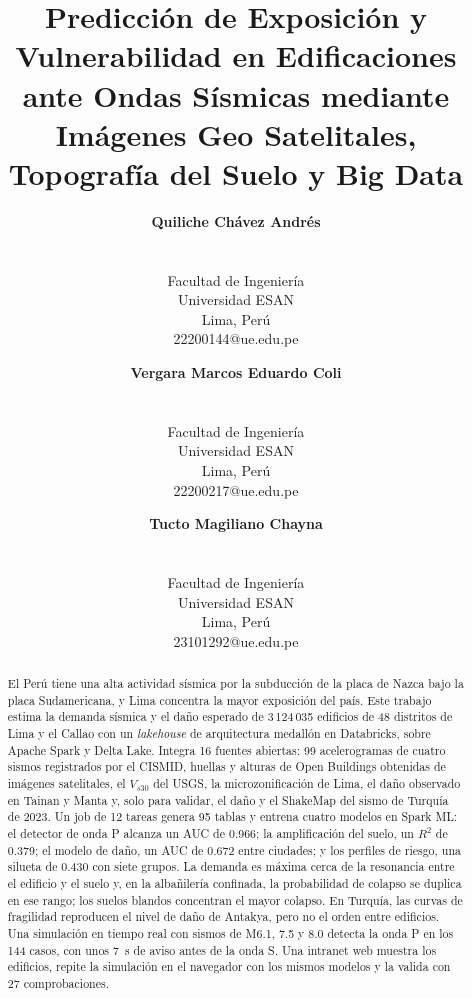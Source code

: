 \documentclass[conference]{IEEEtran}%
\makeatletter
\providecommand{\IEEEauthorblockN}[1]{\begin{tabular}{@{}c@{}}\textbf{#1}\end{tabular}\\}
\providecommand{\IEEEauthorblockA}[1]{\begin{tabular}{@{}c@{}}\small #1\end{tabular}}
\newcommand{\vs}{V_{s30}}
\makeatother
\begin{document}
\title{Predicción de Exposición y Vulnerabilidad en Edificaciones ante Ondas Sísmicas mediante Imágenes Geo Satelitales, Topografía del Suelo y Big Data}

\author{
\IEEEauthorblockN{Quiliche Chávez Andrés}
\IEEEauthorblockA{Facultad de Ingeniería\\Universidad ESAN\\Lima, Perú\\22200144@ue.edu.pe}
\and
\IEEEauthorblockN{Vergara Marcos Eduardo Coli}
\IEEEauthorblockA{Facultad de Ingeniería\\Universidad ESAN\\Lima, Perú\\22200217@ue.edu.pe}
\and
\IEEEauthorblockN{Tucto Magiliano Chayna}
\IEEEauthorblockA{Facultad de Ingeniería\\Universidad ESAN\\Lima, Perú\\23101292@ue.edu.pe}
}

\date{}
\maketitle

\begin{abstract}
El Perú tiene una alta actividad sísmica por la subducción de la placa de Nazca bajo la placa Sudamericana, y Lima concentra la mayor exposición del país. Este trabajo estima la demanda sísmica y el daño esperado de 3\,124\,035 edificios de 48 distritos de Lima y el Callao con un \emph{lakehouse} de arquitectura medallón en Databricks, sobre Apache Spark y Delta Lake. Integra 16 fuentes abiertas: 99 acelerogramas de cuatro sismos registrados por el CISMID, huellas y alturas de Open Buildings obtenidas de imágenes satelitales, el $\vs$ del USGS, la microzonificación de Lima, el daño observado en Tainan y Manta y, solo para validar, el daño y el ShakeMap del sismo de Turquía de 2023. Un job de 12 tareas genera 95 tablas y entrena cuatro modelos en Spark ML: el detector de onda P alcanza un AUC de 0.966; la amplificación del suelo, un $R^{2}$ de 0.379; el modelo de daño, un AUC de 0.672 entre ciudades; y los perfiles de riesgo, una silueta de 0.430 con siete grupos. La demanda es máxima cerca de la resonancia entre el edificio y el suelo y, en la albañilería confinada, la probabilidad de colapso se duplica en ese rango; los suelos blandos concentran el mayor colapso. En Turquía, las curvas de fragilidad reproducen el nivel de daño de Antakya, pero no el orden entre edificios. Una simulación en tiempo real con sismos de M6.1, 7.5 y 8.0 detecta la onda P en los 144 casos, con unos 7~s de aviso antes de la onda S. Una intranet web muestra los edificios, repite la simulación en el navegador con los mismos modelos y la valida con 27 comprobaciones.
\end{abstract}
\end{document}
